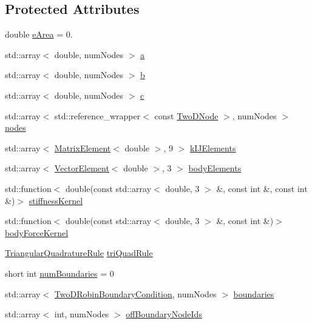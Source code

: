 \subsection*{Protected Attributes}
\begin{DoxyCompactItemize}
\item 
double \hyperlink{a00770_ab74cbf3ff783201003c53439f79307e4}{e\+Area} = 0.
\item 
std\+::array$<$ double, num\+Nodes $>$ \hyperlink{a00770_aad7071cc0cf8762bad7b59789b7bb5fc}{a}
\item 
std\+::array$<$ double, num\+Nodes $>$ \hyperlink{a00770_a75eeb5e4f9b5f6610b0e7112f8324b86}{b}
\item 
std\+::array$<$ double, num\+Nodes $>$ \hyperlink{a00770_ad9152e640f73a7b832ee6d45a1cce567}{c}
\item 
std\+::array$<$ std\+::reference\+\_\+wrapper$<$ const \hyperlink{a00195_a92dafcc05a788e1065a5792b67f0f70e}{Two\+D\+Node} $>$, num\+Nodes $>$ \hyperlink{a00770_add9415a1262a4d58136e1ef11507360b}{nodes}
\item 
std\+::array$<$ \hyperlink{a00195_a1a12603621e7a1efa59ac5cb79f9d509}{Matrix\+Element}$<$ double $>$, 9 $>$ \hyperlink{a00770_a9126763a046ac0736d72b6b5d20ba80d}{k\+I\+J\+Elements}
\item 
std\+::array$<$ \hyperlink{a00195_a08f01d4bb892cf7b2386d0f3a8643d72}{Vector\+Element}$<$ double $>$, 3 $>$ \hyperlink{a00770_a8a85094c0060a67aa1b6abf4a5e660a6}{body\+Elements}
\item 
std\+::function$<$ double(const std\+::array$<$ double, 3 $>$ \&, const int \&, const int \&)$>$ \hyperlink{a00770_ae2480b5335fe78245cb1006e3eeb034d}{stiffness\+Kernel}
\item 
std\+::function$<$ double(const std\+::array$<$ double, 3 $>$ \&, const int \&)$>$ \hyperlink{a00770_a48dbf56bce64a1e97332b03309720154}{body\+Force\+Kernel}
\item 
\hyperlink{a00866}{Triangular\+Quadrature\+Rule} \hyperlink{a00770_a5e50303ae2cfb783f44de143be8a9aac}{tri\+Quad\+Rule}
\item 
short int \hyperlink{a00770_a70ceb410983c87c36546a2a95306dac6}{num\+Boundaries} = 0
\item 
std\+::array$<$ \hyperlink{a00786}{Two\+D\+Robin\+Boundary\+Condition}, num\+Nodes $>$ \hyperlink{a00770_a3b9ec5bc80554d9ffcdd26248061c79f}{boundaries}
\item 
std\+::array$<$ int, num\+Nodes $>$ \hyperlink{a00770_ac9e146872421c7dbd60e08f887b0cfc0}{off\+Boundary\+Node\+Ids}
\end{DoxyCompactItemize}
